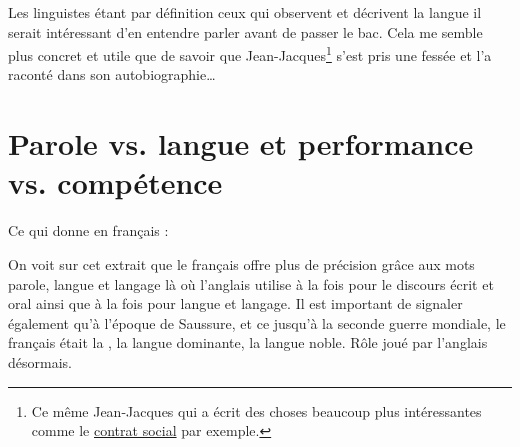 Les linguistes étant par définition ceux qui observent et décrivent la
langue il serait intéressant d'en entendre parler avant de passer le
bac. Cela me semble plus concret et utile que de savoir que
Jean-Jacques\footnote{Ce même Jean-Jacques qui a écrit des choses
  beaucoup plus intéressantes comme le \href{https://www.rousseauonline.ch/pdf/rousseauonline-0004.pdf}{contrat social} par exemple.} s'est pris une fessée et l'a raconté dans son autobiographie\dots{}

\newpage
\section{Parole vs. langue et performance vs. compétence}

\begin{center}
\begin{mdframed}[style=citestyle, frametitle={Extrait du livre \bs}]
\end{mdframed}  
\end{center}


Ce qui donne en français :

\begin{center}
\begin{mdframed}[style=tradstyle, frametitle={\exFR{Traduction} d'un extrait du livre \bs}]
\end{mdframed}  
\end{center}


On voit sur cet extrait que le français offre plus de précision grâce
aux mots parole, langue et langage là où l'anglais utilise
 à la fois pour le discours écrit et oral ainsi que
 à la fois pour langue et langage. Il est important de
signaler également qu'à l'époque de Saussure, et ce jusqu'à la seconde
guerre mondiale, le français était la , la langue
dominante, la langue noble. Rôle joué par l'anglais désormais. 

